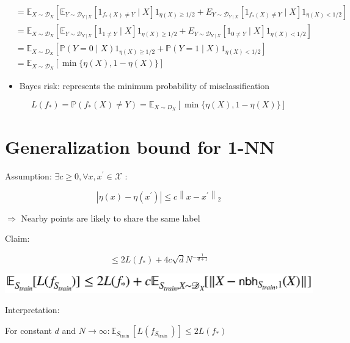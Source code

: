 \documentclass[10pt]{article}
\begin{document}
$$
\begin{aligned}
& =\mathbb{E}_{X \sim \mathscr{D}_{X}}\left[\mathbb{E}_{Y \sim \mathscr{D}_{Y \mid X}}\left[1_{f_{*}(X) \neq Y} \mid X\right] 1_{\eta(X) \geq 1 / 2}+E_{Y \sim \mathscr{D}_{Y \mid X}}\left[1_{f_{*}(X) \neq Y} \mid X\right] 1_{\eta(X)<1 / 2}\right] \\
& =\mathbb{E}_{X \sim \mathscr{D}_{X}}\left[\mathbb{E}_{Y \sim \mathscr{D}_{Y \mid X}}\left[1_{1 \neq Y} \mid X\right] 1_{\eta(X) \geq 1 / 2}+E_{Y \sim \mathscr{D}_{Y \mid X}}\left[1_{0 \neq Y} \mid X\right] 1_{\eta(X)<1 / 2}\right] \\
& =\mathbb{E}_{X \sim D_{X}}\left[\mathbb{P}(Y=0 \mid X) 1_{\eta(X) \geq 1 / 2}+\mathbb{P}(Y=1 \mid X) 1_{\eta(X)<1 / 2}\right] \\
& =\mathbb{E}_{X \sim \mathscr{D}_{X}}[\min \{\eta(X), 1-\eta(X)\}]
\end{aligned}
$$

\begin{itemize}
  \item Bayes risk: represents the minimum probability of misclassification
\end{itemize}

$$
L\left(f_{*}\right)=\mathbb{P}\left(f_{*}(X) \neq Y\right)=\mathbb{E}_{X \sim D_{X}}[\min \{\eta(X), 1-\eta(X)\}]
$$

\section*{Generalization bound for 1-NN}
Assumption: $\exists c \geq 0, \forall x, x^{\prime} \in \mathscr{X}$ :

$$
\left|\eta(x)-\eta\left(x^{\prime}\right)\right| \leq c\left\|x-x^{\prime}\right\|_{2}
$$

$\Rightarrow$ Nearby points are likely to share the same label

Claim:

$$
\leq 2 L\left(f_{*}\right)+4 c \sqrt{d} N^{-\frac{1}{d+1}}
$$

\begin{center}
\includegraphics[max width=\textwidth]{2023_12_30_f937b0007b5d87b39f79g-31}
\end{center}

Interpretation:

For constant $d$ and $N \rightarrow \infty: \mathbb{E}_{S_{\text {train }}}\left[L\left(f_{S_{\text {train }}}\right)\right] \leq 2 L\left(f_{*}\right)$
\end{document}
